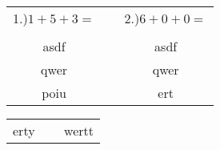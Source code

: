 \documentclass{article}
\begin{document}
\begin{tabular}{ccc}
	1.)$1+5+3=$ & \hspace{5cm} & 2.)$6+0+0=$\\\\
	asdf &\hspace{5cm}& asdf\\
	qwer & $\;$ & qwer\\
	poiu & $\;$ & ert

\end{tabular}
\newpage
\begin{tabular}{ccc}
	erty & $\;$ & wertt
\end{tabular}
\end{document}
